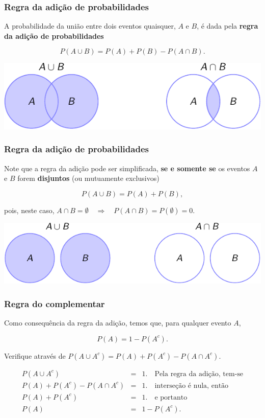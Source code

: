 \documentclass[11pt]{beamer}
\begin{document}
\begin{frame}
\frametitle{Regra da adição de probabilidades}

A probabilidade da união entre dois eventos quaisquer, \(A\) e \(B\), é
dada pela \textbf{regra da adição de probabilidades}

\[
P(A \cup B) = P(A) + P(B) - P(A \cap B).
\]

\begin{center}\includegraphics[width=0.7\linewidth]{figs/regra_adicao1-crop} \end{center}
\end{frame}

\begin{frame}
\frametitle{Regra da adição de probabilidades}

Note que a regra da adição pode ser simplificada, \textbf{se e somente
se} os eventos \(A\) e \(B\) forem \textbf{disjuntos} (ou mutuamente
exclusivos)

\[
P(A \cup B) = P(A) + P(B),
\]

pois, neste caso,
\(A \cap B = \emptyset \quad \Rightarrow \quad P(A \cap B) = P(\emptyset) = 0\).

\begin{center}\includegraphics[width=0.7\linewidth]{figs/regra_adicao2-crop} \end{center}

\end{frame}

\begin{frame}
\frametitle{Regra do complementar}

Como consequência da regra da adição, temos que, para qualquer evento
\(A\),

\[
P(A) = 1 - P(A^c).
\]

Verifique através de \(P(A \cup A^c) = P(A) + P(A^c) - P(A \cap A^c)\).

\begin{eqnarray*} 
P(A \cup A^c) &=& 1. \quad \text{Pela regra da adição, tem-se} \\
P(A) + P(A^c) - P(A \cap A^c) &=& 1. \quad \text{interseção é nula, então} \\
P(A) + P(A^c) &=& 1. \quad \text{e portanto} \\
P(A) &=& 1 - P(A^c).
\end{eqnarray*}

\end{frame}
\end{document}
